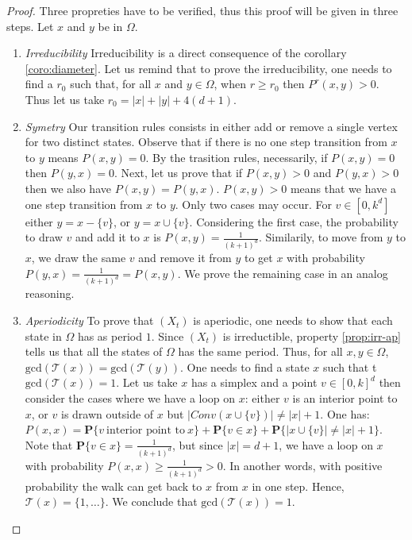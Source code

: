 \documentclass[a4paper]{article}
\begin{document}
\begin{proof}
  Three propreties have to be verified, thus this proof will be given in three steps. Let $x$ and $y$ be in $\Omega$.

  \begin{enumerate}[i]
    \item \textit{Irreducibility}
    Irreducibility is a direct consequence of the corollary \ref{coro:diameter}. Let us remind that to prove the irreducibility, one needs to find a $r_0$ such that, for all $x$ and $y \in \Omega$, when $r \geq{r_0}$ then $P^r(x,y)>0$. Thus let us take $r_0 = |x| + |y| + 4(d+1)$.

     \item \textit{Symetry}
     Our transition rules consists in either add or remove a single vertex for two distinct states. Observe that if there is no one step transition from $x$ to $y$ means $P(x,y)=0$. By the trasition rules, necessarily, if $P(x,y)=0$ then $P(y,x)=0$.
     Next, let us prove that if $P(x,y)>0$ and $P(y,x)>0$ then we also have $P(x,y) = P(y,x)$. $P(x,y)>0$ means that we have a one step transition from $x$ to $y$. Only two cases may occur. For $v \in [0,k^d]$ either $y = x - \{v\}$, or $y = x \cup \{v\}$. Considering the first case, the probability to draw $v$ and add it to $x$ is $P(x,y) = \frac{1}{(k+1)^d}$. Similarily, to move from $y$ to $x$, we draw the same $v$ and remove it from $y$ to get $x$ with probability $P(y,x) = \frac{1}{(k+1)^d} = P(x,y)$. We prove the remaining case in an analog reasoning.

     \item \textit{Aperiodicity}
     To prove that $(X_t)$ is aperiodic, one needs to show that each state in $\Omega$ has as period $1$. Since $(X_t)$ is irreductible, property \ref{prop:irr-ap} tells us that all the states of $\Omega$ has the same period. Thus, for all $x, y \in \Omega$, $\mathrm{gcd}(\mathcal{T}(x)) = \mathrm{gcd}(\mathcal{T}(y))$. One needs to find a state $x$ such that t$\mathrm{gcd}(\mathcal{T}(x)) = 1$. Let us take $x$ has a simplex and a point $v \in [0,k]^d$ then consider the cases where we have a loop on $x$:
     either $v$ is an interior point to $x$, or $v$ is drawn outside of $x$ but $|Conv(x \cup \{v\})| \neq |x| + 1$. One has: $P(x,x) = \mathbf{P}\{v \  \mbox{interior point to} \ x\} + \mathbf{P}\{v \in x\} + \mathbf{P}\{|x \cup \{v\}| \neq |x| + 1\}$.
     Note that $\mathbf{P}\{v \in x\} = \frac{1}{(k+1)^d}$, but since $|x| = d+1$, we have a loop on $x$ with probability $P(x,x) \geq{\frac{1}{(k+1)^d}} > 0$. In another words, with positive probability the walk can get back to $x$ from $x$ in one step. Hence, $\mathcal{T}(x) = \{1, \dots\}$. We conclude that $\mathrm{gcd}(\mathcal{T}(x)) = 1$.

   \end{enumerate}
\end{proof}
\end{document}
